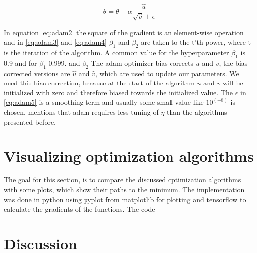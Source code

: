 \documentclass[aodsor,preprint]{imsart}
\numberwithin{equation}{section}
\theoremstyle{plain}
\begin{document}
\begin{equation} \label{eq:adam5}
\theta = \theta - \alpha \frac{\hat{u}}{\sqrt{\hat{v}} + \epsilon}
\end{equation}

In equation \ref{eq:adam2} the square of the gradient is an element-wise operation and in \ref{eq:adam3} and \ref{eq:adam4} $\beta_{1}$ and $\beta_{2}$ are taken to the t'th power, where t is the iteration of the algorithm. A common value for the hyperparameter $\beta_{1}$ is 0.9 and for $\beta_{1}$ 0.999. and $\beta_{2}$   The adam optimizer bias corrects $u$ and $v$, the bias corrected versions are $\hat{u}$ and $\hat{v}$, which are used to update our parameters. We need this bias correction, because at the start of the algorithm $u$ and $v$ will be initialized with zero and therefore biased towards the initialized value.
The $\epsilon$ in \ref{eq:adam5} is a smoothing term and usually some small value like $10^(-8)$ is chosen. \cite{geron2019hands} mentions that adam requires less tuning of $\eta$ than the algorithms presented before.

\section{Visualizing optimization algorithms}
The goal for this section, is to compare the discussed optimization algorithms with some plots, which show their paths to the minimum. The implementation was done in python using pyplot from matplotlib for plotting and tensorflow to calculate the gradients of the functions. The code 

\section{Discussion}


{}
\end{document}
